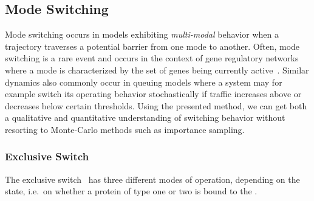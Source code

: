 \subsection{Mode Switching}
Mode switching occurs in models exhibiting   \emph{multi-modal} behavior
when a trajectory   traverses a potential barrier from one mode
to another.
Often, mode switching is a rare event and occurs in the context of gene regulatory networks where a mode is characterized by the set of genes being currently active~\parencite{loinger2007stochastic}. 
Similar dynamics also commonly occur in queuing models where a system may for example switch its operating  behavior stochastically if
traffic increases above or decreases below certain thresholds.
Using the presented method, we can get both a   qualitative and quantitative understanding of   switching
behavior without resorting to Monte-Carlo methods such as   importance sampling.

\subsubsection*{Exclusive Switch}
The exclusive switch~\parencite{barzel2008calculation}  has three different modes of operation, depending on the
 state, i.e.\ on whether a protein of type one or two is bound to
the .

